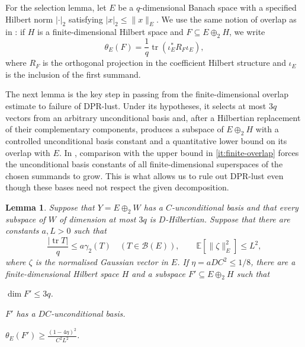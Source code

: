 \documentclass[11pt,a4paper,reqno]{amsart}
\newtheorem{lemma}[lemma]{Lemma}
\theoremstyle{definition}
\newcommand{\norm}[1]{\lVert #1\rVert}
\DeclareMathOperator{\tr}{tr}
\numberwithin{equation}{section}
\begin{document}
For the selection lemma, let $E$ be a $q$-dimensional Banach space with a specified Hilbert norm $|\cdot|_2$ satisfying $|x|_2\leq\norm{x}_E$. We use the same notion of overlap as in : if $H$ is a finite-dimensional Hilbert space and $F\subseteq E\oplus_2H$, we write
\begin{equation*}
    \theta_E(F)=\frac1q\tr(\iota_E^*R_F\iota_E),
\end{equation*}
where $R_F$ is the orthogonal projection in the coefficient Hilbert structure and $\iota_E$ is the inclusion of the first summand.

The next lemma is the key step in passing from the finite-dimensional overlap estimate to failure of DPR-lust. Under its hypotheses, it selects at most $3q$ vectors from an arbitrary unconditional basis and, after a Hilbertian replacement of their complementary components, produces a subspace of $E\oplus_2H$ with a controlled unconditional basis constant and a quantitative lower bound on its overlap with $E$. In , comparison with the upper bound in \ref{it:finite-overlap} forces the unconditional basis constants of all finite-dimensional superspaces of the chosen summands to grow. This is what allows us to rule out DPR-lust even though these bases need not respect the given decomposition.

\begin{samepage}
\begin{lemma}\label{lem:finite-selection}\label{prop:selection}
Suppose that $Y=E\oplus_2W$ has a $C$-unconditional basis and that every subspace of $W$ of dimension at most $3q$ is $D$-Hilbertian. Suppose that there are constants $a,L>0$ such that
\begin{equation}\label{eq:selection-hypotheses}
    \frac{|\tr T|}{q}\leq a\gamma_2(T)
       \quad(T\in\mathscr B(E)),
    \qquad \mathbb E[\norm{\zeta}_E^2]\leq L^2,
\end{equation}
where $\zeta$ is the normalised Gaussian vector in $E$. If $\eta=aDC^2\leq1/8$, there are a finite-dimensional Hilbert space $H$ and a subspace $F'\subseteq E\oplus_2H$ such that
\begin{resultparts}
\item\label{it:selection-dimension} $\dim F'\leq3q$.
\item\label{it:selection-basis} $F'$ has a $DC$-unconditional basis.
\item\label{it:selection-overlap} $\displaystyle\theta_E(F')\geq\frac{(1-4\eta)^2}{C^2L^2}$.
\end{resultparts}
\end{lemma}
\end{samepage}
\end{document}
